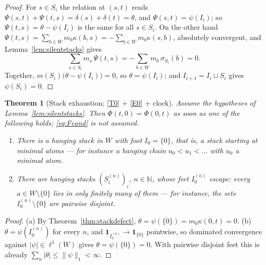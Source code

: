 \documentclass[11pt,a4paper]{article}
\theoremstyle{plain}
\newtheorem{theorem}{Theorem}[section]
\theoremstyle{definition}
\theoremstyle{remark}
\newcommand{\N}{\mathbb{N}}
\newcommand{\one}{\mathbf{1}}
\begin{document}
\begin{proof}
  For $s \in S_i$ the relation at $(s,t)$ reads
  $\Psi(s,t) + \Psi(t,s) = \delta(s) + \delta(t) = \theta$, and
  $\Psi(s,t) = \psi(I_i)$; so $\Psi(t,s) = \theta - \psi(I_i)$ is the same
  for all $s \in S_i$.  On the other hand
  $\Psi(t,s) = \sum_{b \in W} m_b\kappa(b,s) = -\sum_{b \in W} m_b\kappa(s,b)$,
  absolutely convergent, and Lemma~\ref{lem:silentstacks} gives
  \[
    \sum_{s \in S_i} m_s\,\Psi(t,s)
      = -\sum_{b \in W} m_b\,\sigma_{S_i}(b) = 0 .
  \]
  Together, $m(S_i)\bigl(\theta - \psi(I_i)\bigr) = 0$, so
  $\theta = \psi(I_i)$; and $I_{i+1} = I_i \sqcup S_i$ gives $\psi(S_i) = 0$.
\end{proof}

\begin{theorem}[Stack exhaustion; \eqref{T0} + \eqref{E0} + clock]
  \label{thm:stackexhaustion}
  Assume the hypotheses of Lemma~\ref{lem:silentstacks}.  Then
  $\Phi(t,0) = \Phi(0,t)$ as soon as one of the following holds;
  \eqref{eq:Fcond} is not assumed.
  \begin{enumerate}[label=(\alph*)]
  \item There is a hanging stack in $W$ with foot $I_0 = \{0\}$, that is, a
    stack starting at minimal atoms --- for instance a hanging chain
    $u_0 < u_1 < \dots$ with $u_0$ a minimal atom.
  \item There are hanging stacks $(S^{(n)}_i)_i$, $n \in \N$, whose feet
    $I^{(n)}_0$ \emph{escape}: every $a \in W \setminus \{0\}$ lies in only
    finitely many of them --- for instance, the sets
    $I^{(n)}_0 \setminus \{0\}$ are pairwise disjoint.
  \end{enumerate}
\end{theorem}

\begin{proof}
  (a) By Theorem~\ref{thm:stackdefect},
  $\theta = \psi(\{0\}) = m_0\kappa(0,t) = 0$.
  (b) $\theta = \psi(I^{(n)}_0)$ for every $n$, and
  $\one_{I^{(n)}_0} \to \one_{\{0\}}$ pointwise, so dominated convergence
  against $\lvert\psi\rvert \in \ell^1(W)$ gives $\theta = \psi(\{0\}) = 0$.
  With pairwise disjoint feet this is already
  $\sum_n \lvert\theta\rvert \leq \lVert\psi\rVert_1 < \infty$.
\end{proof}
\end{document}
